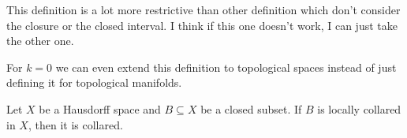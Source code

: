 \begin{rem}
    This definition is a lot more restrictive than other definition which don't consider the closure or the closed interval. I think if this one doesn't work, I can just take the other one. 
\end{rem}

\begin{rem}
    For $k=0$ we can even extend this definition to topological spaces instead of just defining it for topological manifolds. 
\end{rem}

\begin{thm}
    Let $X$ be a Hausdorff space and $B \subseteq X$ be a closed subset. 
    If $B$ is locally collared in $X$, then it is collared.
\end{thm}

